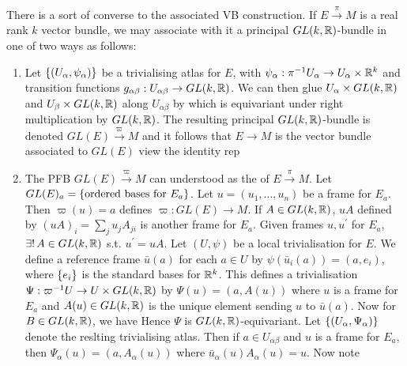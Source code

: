 \documentclass{article}
\begin{document}
There is a sort of converse to the associated VB construction. If $E \overset{\pi}{\to}M$ is a real rank $k$ vector bundle, we may associate with it a principal $GL(k,\mathbb{R})$-bundle in one of two ways as follows:
\begin{enumerate}
	\item Let $\left\{ (U_\alpha,\psi_\alpha) \right\}$ be a trivialising atlas for $E$, with $\psi_\alpha : \pi^{-1} U_\alpha \to U_\alpha \times \mathbb{R}^k$ and transition functions $g_{\alpha\beta}:U_{\alpha\beta} \to GL(k,\mathbb{R})$. We can then glue $U_\alpha \times GL(k,\mathbb{R})$ and 
	$U_\beta \times GL(k,\mathbb{R})$ along $U_{\alpha\beta}$ by 
	which is equivariant under right multiplication by $GL(k,\mathbb{R})$. The resulting principal $GL(k,\mathbb{R})$-bundle is denoted $GL(E) \overset{\varpi}{\to} M$ and it follows that $E \to M$ is the vector bundle associated to $GL(E)$ view the identity rep
	\item The PFB $GL(E) \overset{\varpi}{\to} M $ can understood as the  of $E \overset{\pi}{\to} M$. Let $GL(E)_a = \left\{ \text{ordered bases for }E_a \right\}$. Let $u = (u_1, \dots, u_n)$ be a frame for $E_a$. Then $\varpi(u) = a$ defines $\varpi : GL(E) \to M$. If $A \in GL(k,\mathbb{R})$, $uA$ defined by $(uA)_i = \sum_j u_j A_{ji}$ is another frame for $E_a$. Given frames $u,u^\prime$ for $E_a$, $\exists ! \, A \in GL(k,\mathbb{R})$ s.t. $u^\prime = uA$. Let $(U,\psi)$ be a local trivialisation for $E$. We define a reference frame $\bar{u}(a)$ for each $a \in U$ by $\psi(\bar{u}_i(a)) = (a,e_i)$, where $\left\{ e_i \right\}$ is the standard bases for $\mathbb{R}^k$. This defines a trivialisation $\Psi : \varpi^{-1} U \to U \times GL(k,\mathbb{R})$ by $\Psi(u) = (a,A(u))$ where $u$ is a frame for $E_a$ and $A(u)\in GL(k,\mathbb{R})$ is the unique element sending $u$ to $\bar{u}(a)$. Now for $B \in GL(k,\mathbb{R})$, we have 
	Hence $\Psi$ is $GL(k,\mathbb{R})$-equivariant. Let $\left\{ (U_\alpha,\Psi_\alpha) \right\}$ denote the reslting trivialising atlas. Then if $a \in U_{\alpha\beta}$ and $u$ is a frame for $E_a$, then $\Psi_\alpha(u) = (a,A_\alpha(u))$ where $\bar{u}_\alpha(u) A_\alpha(u) = u$. Now note 
\end{enumerate}
\end{document}
